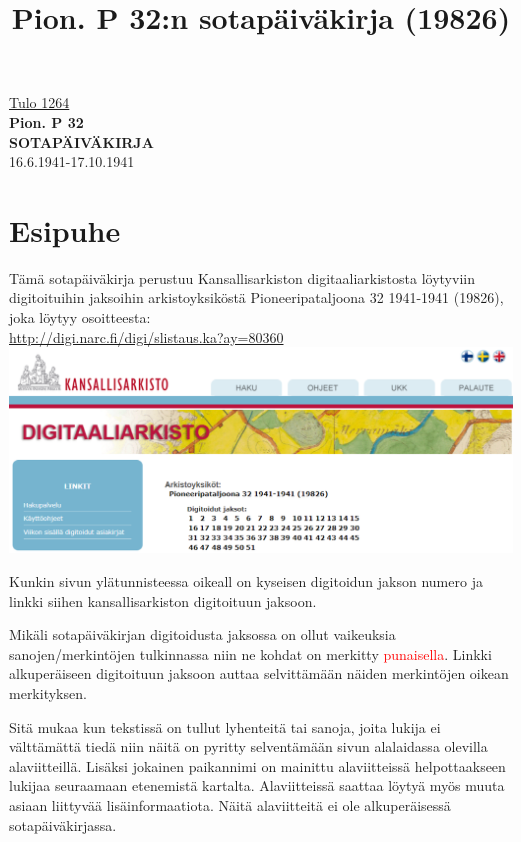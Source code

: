 \documentclass[11pt,a5paper,oneside]{book}
\title{Pion. P 32:n sotapäiväkirja (19826)}
\begin{document}
\extramarks{}{}

\begin{titlepage}
	\begin{center}
		\vspace*{1.5cm}
        \href{http://digi.narc.fi/digi/view.ka?kuid=3753911}{\Large Tulo 1264} \\
       	\vspace{1.5cm}
        \textbf{\Large Pion. P 32} \\
       	\vspace{1.5cm}
		\textbf{\Huge SOTAPÄIVÄKIRJA} \\
		\vspace{1.5cm}
		\Large 16.6.1941-17.10.1941 \\
   	\end{center}
\end{titlepage}

\extramarks{}{}
\section{Esipuhe}
Tämä sotapäiväkirja perustuu Kansallisarkiston digitaaliarkistosta löytyviin digitoituihin jaksoihin arkistoyksiköstä Pioneeripataljoona 32 1941-1941 (19826), joka löytyy osoitteesta: \\
\url{http://digi.narc.fi/digi/slistaus.ka?ay=80360} \\

\includegraphics[scale=0.45]{jaksot_19826.png}

Kunkin sivun ylätunnisteessa oikeall on kyseisen digitoidun jakson numero ja linkki siihen kansallisarkiston digitoituun jaksoon.

Mikäli sotapäiväkirjan digitoidusta jaksossa on ollut vaikeuksia sanojen/merkintöjen tulkinnassa niin ne kohdat on merkitty \textcolor{red}{punaisella}. Linkki alkuperäiseen digitoituun jaksoon auttaa selvittämään näiden merkintöjen oikean merkityksen.

Sitä mukaa kun tekstissä on tullut lyhenteitä tai sanoja, joita lukija ei välttämättä tiedä niin näitä on pyritty selventämään sivun alalaidassa olevilla alaviitteillä. Lisäksi jokainen paikannimi on mainittu alaviitteissä helpottaakseen lukijaa seuraamaan etenemistä kartalta. Alaviitteissä saattaa löytyä myös muuta asiaan liittyvää lisäinformaatiota. Näitä alaviitteitä ei ole alkuperäisessä sotapäiväkirjassa.
\end{document}
